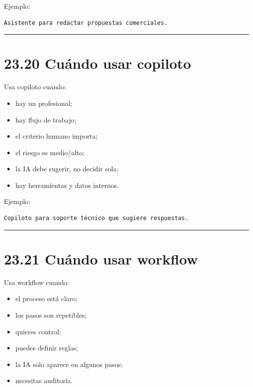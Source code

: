Ejemplo:

\begin{lstlisting}
Asistente para redactar propuestas comerciales.
\end{lstlisting}

\begin{center}\rule{0.5\linewidth}{0.5pt}\end{center}

\section{23.20 Cuándo usar copiloto}\label{cuuxe1ndo-usar-copiloto}

Usa copiloto cuando:

\begin{itemize}
\tightlist
\item
  hay un profesional;
\item
  hay flujo de trabajo;
\item
  el criterio humano importa;
\item
  el riesgo es medio/alto;
\item
  la IA debe sugerir, no decidir sola;
\item
  hay herramientas y datos internos.
\end{itemize}

Ejemplo:

\begin{lstlisting}
Copiloto para soporte técnico que sugiere respuestas.
\end{lstlisting}

\begin{center}\rule{0.5\linewidth}{0.5pt}\end{center}

\section{23.21 Cuándo usar workflow}\label{cuuxe1ndo-usar-workflow}

Usa workflow cuando:

\begin{itemize}
\tightlist
\item
  el proceso está claro;
\item
  los pasos son repetibles;
\item
  quieres control;
\item
  puedes definir reglas;
\item
  la IA solo aparece en algunos pasos;
\item
  necesitas auditoría.
\end{itemize}

